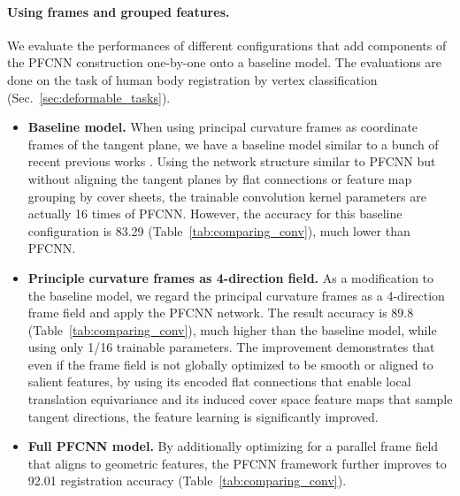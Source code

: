 \documentclass[10pt,twocolumn,letterpaper]{article}
\begin{document}
\vspace{-4mm}
\paragraph{Using frames and grouped features.}
We evaluate the performances of different configurations that add components of the PFCNN construction one-by-one onto a baseline model. The evaluations are done on the task of human body registration by vertex classification (Sec.~\ref{sec:deformable_tasks}).
\vspace{-2mm}
\begin{itemize}
	\itemsep0em
	\item \textbf{Baseline model.} When using principal curvature frames as coordinate frames of the tangent plane, we have a baseline model similar to a bunch of recent previous works \cite{AnisoCNN:NIPS2016,MoNet2017,Zhong:DirectionalCNN:2017,Koltun:2018:TangentConv}.
	Using the network structure similar to PFCNN but without aligning the tangent planes by flat connections or feature map grouping by cover sheets, the trainable convolution kernel parameters are actually 16 times of PFCNN.
	However, the accuracy for this baseline configuration is 83.29 (Table~\ref{tab:comparing_conv}), much lower than PFCNN.
	\item \textbf{Principle curvature frames as 4-direction field.} As a modification to the baseline model, we regard the principal curvature frames as a 4-direction frame field and apply the PFCNN network. The result accuracy is 89.8 (Table~\ref{tab:comparing_conv}), much higher than the baseline model, while using only 1/16 trainable parameters.
	The improvement demonstrates that even if the frame field is not globally optimized to be smooth or aligned to salient features, by using its encoded flat connections that enable local translation equivariance and its induced cover space feature maps that sample tangent directions, the feature learning is significantly improved.
	\item \textbf{Full PFCNN model.} By additionally optimizing for a parallel frame field that aligns to geometric features, the PFCNN framework further improves to 92.01 registration accuracy (Table~\ref{tab:comparing_conv}).
\end{itemize}
\vspace{-3mm}
\end{document}
